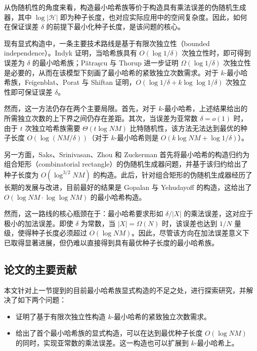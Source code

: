从伪随机性的角度来看，构造最小哈希族等价于构造具有乘法误差的伪随机生成器，其中 $\log |\mathcal{H}|$ 即为种子长度，也对应实际应用中的空间复杂度。因此，如何在保证误差 $\delta$ 的前提下最小化种子长度，是该问题的核心。

现有显式构造中，一条主要技术路线是基于有限次独立性（bounded independence）。Indyk \cite{minwise_Indyk} 证明，当哈希族具有 $O(\log 1/\delta)$ 次独立性时，即可得到误差为 $\delta$ 的最小哈希族；P{\u{a}}tra{\c{s}}cu 与 Thorup \cite{PT_lb_t_wise_min_wise} 进一步证明 $\Omega(\log 1/\delta)$ 次独立性是必要的，从而在该模型下刻画了最小哈希的紧致独立次数需求。对于 $k$-最小哈希族，Feigenblat、Porat 与 Shiftan \cite{minwise_FPS11} 证明，$O(\log 1/\delta + k \log \log 1/\delta)$ 次独立性即可保证误差 $\delta$。

然而，这一方法仍存在两个主要局限。首先，对于 $k$-最小哈希，上述结果给出的所需独立次数的上下界之间仍存在差距。其次，当误差为亚常数 $\delta = o(1)$ 时，由于 $t$ 次独立哈希族需要 $\Theta(t \log NM)$ 比特随机性，该方法无法达到最优的种子长度 $O(\log (NM / \delta))$（对于 $k$-最小哈希则是 $O(k \log NM + \log 1 / \delta)$）。

另一方面，Saks、Srinivasan、Zhou 和 Zuckerman \cite{SSZZ00_connection_CR_min_wise} 首先将最小哈希的构造归约为组合矩形（combinatorial rectangle）的伪随机生成器问题，并基于该归约给出了种子长度为 $O(\log^{3/2} NM)$ 的构造。此后，针对组合矩形的伪随机生成器经历了长期的发展与改进，目前最好的结果是 Gopalan 与 Yehudayoff \cite{GY20_PRG_CR_SOTA} 的构造，这给出了 $O(\log NM \cdot \log \log NM)$ 的最小哈希构造。

然而，这一路线的核心瓶颈在于：最小哈希要求形如 $\delta/|X|$ 的乘法误差，这对应于极小的加法误差。即使 $\delta$ 为常数，当 $|X| = \Omega(N)$ 时，该误差也达到 $1/N$ 量级，使得种子长度必须超过 $O(\log N M)$。因此，尽管该方向在加法误差意义下已取得显著进展，但仍难以直接得到具有最优种子长度的最小哈希族。

\subsection{论文的主要贡献}

本文针对上一节提到的目前最小哈希族显式构造的不足之处，进行探索研究，并解决了如下两个问题：
\begin{itemize}
    \item 证明了基于有限次独立性构造 $k$-最小哈希的紧致独立次数需求。
    
    \item 给出了首个最小哈希族的显式构造，可以在达到最优种子长度 $O(\log N M)$ 的同时，实现亚常数的乘法误差。这一构造也可以扩展到 $k$-最小哈希上。
\end{itemize}

